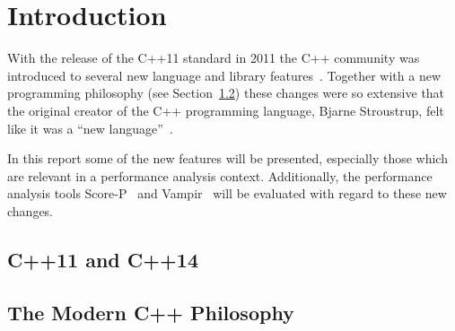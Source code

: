 \section{Introduction}

With the release of the C++11 standard in 2011 the C++ community was introduced to several new language and library features~\cite{cpp11std}. Together with a new programming philosophy (see Section~\ref{subs:intro_philosophy}) these changes were so extensive that the original creator of the C++ programming language, Bjarne Stroustrup, felt like it was a ``new language''~\cite{tcpp}.

In this report some of the new features will be presented, especially those which are relevant in a performance analysis context. Additionally, the performance analysis tools Score-P~\cite{scorep} and Vampir~\cite{vampir} will be evaluated with regard to these new changes.

\subsection{C++11 and C++14}

\subsection{The Modern C++ Philosophy}\label{subs:intro_philosophy}
